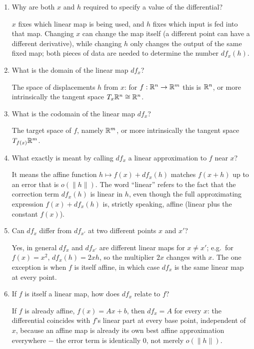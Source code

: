 \documentclass{self-check}
\begin{document}
\begin{enumerate}[resume, leftmargin=*, itemsep=8pt]
\item Why are both \(x\) and \(h\) required to specify a value of the differential?
\begin{answer}
\(x\) fixes which linear map is being used, and \(h\) fixes which input is fed into that map. Changing \(x\) can change the map itself (a different point can have a different derivative), while changing \(h\) only changes the output of the same fixed map; both pieces of data are needed to determine the number \(df_x(h)\).
\end{answer}

\item What is the domain of the linear map \(df_x\)?
\begin{answer}
The space of displacements \(h\) from \(x\): for \(f:\mathbb{R}^n\to\mathbb{R}^m\) this is \(\mathbb{R}^n\), or more intrinsically the tangent space \(T_x\mathbb{R}^n\cong\mathbb{R}^n\).
\end{answer}

\item What is the codomain of the linear map \(df_x\)?
\begin{answer}
The target space of \(f\), namely \(\mathbb{R}^m\), or more intrinsically the tangent space \(T_{f(x)}\mathbb{R}^m\).
\end{answer}

\item What exactly is meant by calling \(df_x\) a linear approximation to \(f\) near \(x\)?
\begin{answer}
It means the affine function \(h\mapsto f(x)+df_x(h)\) matches \(f(x+h)\) up to an error that is \(o(\|h\|)\). The word ``linear'' refers to the fact that the correction term \(df_x(h)\) is linear in \(h\), even though the full approximating expression \(f(x)+df_x(h)\) is, strictly speaking, affine (linear plus the constant \(f(x)\)).
\end{answer}

\item Can \(df_x\) differ from \(df_{x'}\) at two different points \(x\) and \(x'\)?
\begin{answer}
Yes, in general \(df_x\) and \(df_{x'}\) are different linear maps for \(x\ne x'\); e.g.\ for \(f(x)=x^2\), \(df_x(h)=2xh\), so the multiplier \(2x\) changes with \(x\). The one exception is when \(f\) is itself affine, in which case \(df_x\) is the same linear map at every point.
\end{answer}

\item If \(f\) is itself a linear map, how does \(df_x\) relate to \(f\)?
\begin{answer}
If \(f\) is already affine, \(f(x)=Ax+b\), then \(df_x=A\) for every \(x\): the differential coincides with \(f\)'s linear part at every base point, independent of \(x\), because an affine map is already its own best affine approximation everywhere \(-\) the error term is identically \(0\), not merely \(o(\|h\|)\).
\end{answer}


\end{enumerate}
\end{document}
